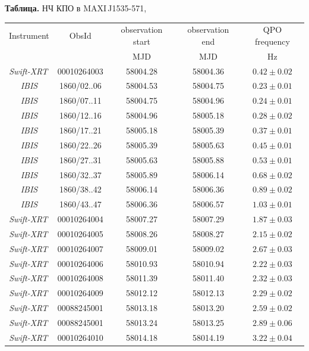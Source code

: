 \documentclass{pazhb}
\def\swiftx{{\em Swift-XRT\,}}
\def\jemx{{\em JEM-X}}
\def\ibis{ {\em IBIS}}
\begin{document}
\begin{table}[t]

\vspace{6mm}
\centering
{{\bf Таблица.} НЧ КПО в \mbox{MAXI\,J1535-571},\protect\\}
\label{tab:qpo}
\vspace{5mm}\begin{tabular}{c|c|c|c|c} \hline\hline
Instrument & ObsId & observation start & observation end &  QPO frequency\\
                   &           &  MJD                     & MJD                    & Hz \\
\hline
\swiftx & 00010264003 &58004.28&58004.36&  $0.42\pm 0.02 $\\
\ibis & 1860/02..06 &58004.53&58004.75&  $0.23\pm 0.01 $\\
\ibis & 1860/07..11 &58004.75&58004.96&  $0.24\pm 0.01 $\\
\ibis & 1860/12..16 &58004.96&58005.18&  $0.28\pm 0.02 $\\
\ibis & 1860/17..21 &58005.18&58005.39&  $0.37\pm 0.01 $\\
\ibis & 1860/22..26 &58005.39&58005.63&  $0.45\pm 0.01 $\\
\ibis & 1860/27..31 &58005.63&58005.88&  $0.53\pm 0.01 $\\
\ibis & 1860/32..37 &58005.89&58006.14&  $0.68\pm 0.02 $\\
\ibis & 1860/38..42 &58006.14&58006.36&  $0.89\pm 0.02 $\\
\ibis & 1860/43..47 &58006.36&58006.57&  $1.03\pm 0.01 $\\
\swiftx & 00010264004 &58007.27&58007.29&  $1.87\pm 0.03 $\\
\swiftx & 00010264005 &58008.26&58008.27&  $2.15\pm 0.02 $\\
\swiftx & 00010264007 &58009.01&58009.02&  $2.67\pm 0.03 $\\
\swiftx & 00010264006 &58010.93&58010.94&  $2.22\pm 0.03 $\\
\swiftx &00010264008 &58011.39&58011.40&  $2.32\pm 0.03 $\\
\swiftx &00010264009 &58012.12&58012.13&  $2.29\pm 0.02 $\\
\swiftx &00088245001 &58013.18&58013.20&  $2.59\pm 0.02 $\\
\swiftx &00088245001 &58013.24&58013.25&  $2.89\pm 0.06 $\\
\swiftx &00010264010 &58014.18&58014.19&  $3.22\pm 0.04 $\\
\hline
\end{tabular}
\end{table}







\acknowledgements

\label{lastpage}




\end{document}

